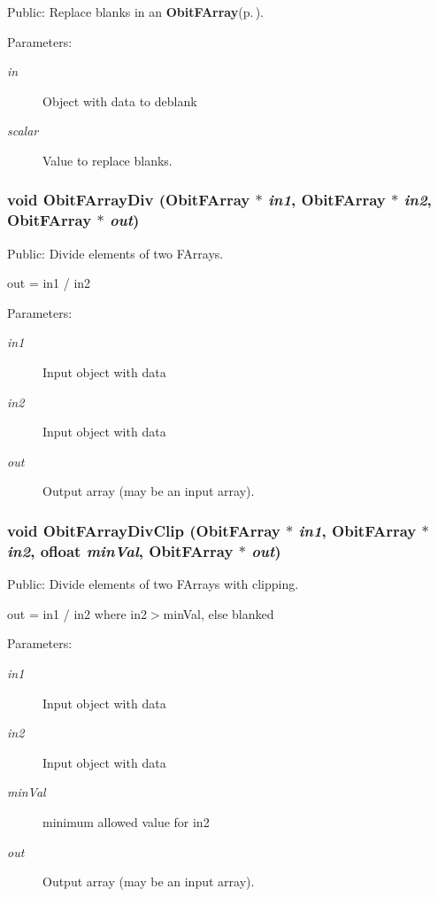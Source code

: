 Public: Replace blanks in an {\bf Obit\-FArray}{\rm (p.\,\pageref{structObitFArray})}. 

\begin{Desc}
\item[Parameters:]
\begin{description}
\item[{\em in}]Object with data to deblank \item[{\em scalar}]Value to replace blanks. \end{description}
\end{Desc}
\subsubsection{\setlength{\rightskip}{0pt plus 5cm}void Obit\-FArray\-Div ({\bf Obit\-FArray} $\ast$ {\em in1}, {\bf Obit\-FArray} $\ast$ {\em in2}, {\bf Obit\-FArray} $\ast$ {\em out})}\label{ObitFArray_8c_a55}


Public: Divide elements of two FArrays. 

out = in1 / in2 \begin{Desc}
\item[Parameters:]
\begin{description}
\item[{\em in1}]Input object with data \item[{\em in2}]Input object with data \item[{\em out}]Output array (may be an input array). \end{description}
\end{Desc}
\subsubsection{\setlength{\rightskip}{0pt plus 5cm}void Obit\-FArray\-Div\-Clip ({\bf Obit\-FArray} $\ast$ {\em in1}, {\bf Obit\-FArray} $\ast$ {\em in2}, {\bf ofloat} {\em min\-Val}, {\bf Obit\-FArray} $\ast$ {\em out})}\label{ObitFArray_8c_a56}


Public: Divide elements of two FArrays with clipping. 

out = in1 / in2 where in2$>$min\-Val, else blanked \begin{Desc}
\item[Parameters:]
\begin{description}
\item[{\em in1}]Input object with data \item[{\em in2}]Input object with data \item[{\em min\-Val}]minimum allowed value for in2 \item[{\em out}]Output array (may be an input array). \end{description}
\end{Desc}
